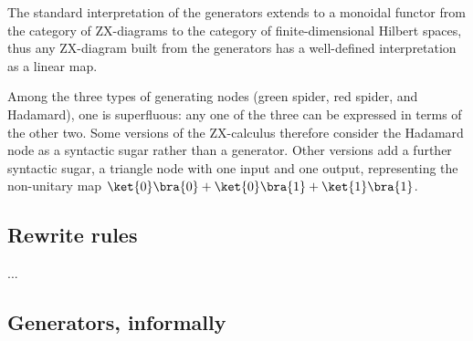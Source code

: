 \documentclass[a4paper, 12pt]{article}
\begin{document}
The standard interpretation of the generators extends to a monoidal functor from the category of ZX-diagrams to the category of finite-dimensional Hilbert spaces, thus any ZX-diagram built from the generators has a well-defined interpretation as a linear map.

Among the three types of generating nodes (green spider, red spider, and Hadamard), one is superfluous: any one of the three can be expressed in terms of the other two. Some versions of the ZX-calculus therefore consider the Hadamard node as a syntactic sugar rather than a generator. Other versions add a further syntactic sugar, a triangle node with one input and one output, representing the non-unitary map $\ket{0}\bra{0}+\ket{0}\bra{1}+\ket{1}\bra{1}$.


\subsection{Rewrite rules}
...


\subsection{Generators, informally}
\end{document}
